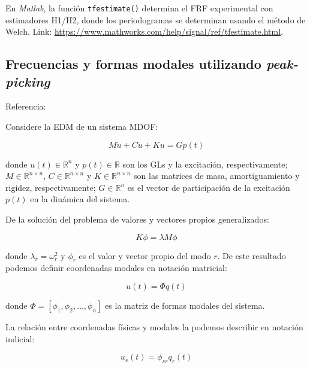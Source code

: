 En \emph{Matlab}, la función \texttt{tfestimate()} determina el FRF experimental con estimadores H1/H2, donde los periodogramas se determinan usando el método de Welch. Link:
\url{https://www.mathworks.com/help/signal/ref/tfestimate.html}.


\subsection{Frecuencias y formas modales utilizando \emph{peak-picking}}

Referencia: \textcite[Sec. 18.6]{craig2006fundamentalsstructural}

Considere la EDM de un sistema MDOF:

\begin{equation}
    M \ddot{u} + C \dot{u} + K u = G p(t)
\end{equation}

\noindent donde $u(t) \in \mathbb{R}^n$ y $p(t) \in \mathbb{R}$ son los GLs y la excitación, respectivamente; $M \in \mathbb{R}^{n \times n}$, $C \in \mathbb{R}^{n \times n}$ y $K \in \mathbb{R}^{n \times n}$ son las matrices de masa, amortiguamiento y rigidez, respectivamente; $G \in \mathbb{R}^{n}$ es el vector de participación de la excitación $p(t)$ en la dinámica del sistema.

De la solución del problema de valores y vectores propios generalizados:

\begin{equation}
    K \phi = \lambda M \phi
\end{equation}

\noindent donde $\lambda_r = \omega_r^2$ y $\phi_r$ es el valor y vector propio del modo $r$. De este resultado podemos definir coordenadas modales  en notación matricial:

\begin{equation}
    u(t) = \Phi q(t)
\end{equation}

\noindent donde $\Phi = [\phi_1, \phi_2, \ldots,\phi_n]$ es la matriz de formas modales del sistema.

La relación entre coordenadas físicas y modales la podemos describir en notación indicial:

\begin{equation}\label{eq:coordmod}
    u_{s}(t) = \phi_{sr} q_r(t)    
\end{equation}

